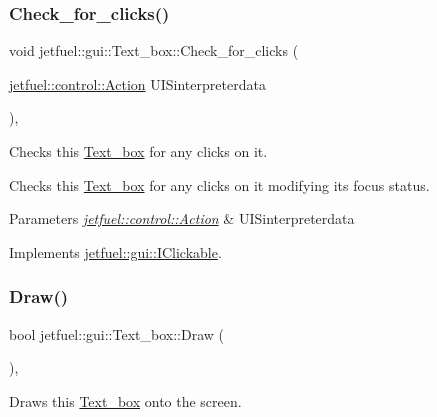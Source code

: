 \subsubsection{\texorpdfstring{Check\+\_\+for\+\_\+clicks()}{Check\_for\_clicks()}}
{\footnotesize\ttfamily void jetfuel\+::gui\+::\+Text\+\_\+box\+::\+Check\+\_\+for\+\_\+clicks (\begin{DoxyParamCaption}\item[{\hyperlink{structjetfuel_1_1control_1_1Action}{jetfuel\+::control\+::\+Action}}]{U\+I\+Sinterpreterdata }\end{DoxyParamCaption})\hspace{0.3cm}{\ttfamily [override]}, {\ttfamily [virtual]}}



Checks this \hyperlink{classjetfuel_1_1gui_1_1Text__box}{Text\+\_\+box} for any clicks on it. 

Checks this \hyperlink{classjetfuel_1_1gui_1_1Text__box}{Text\+\_\+box} for any clicks on it modifying it\textquotesingle{}s focus status.


\begin{DoxyParams}{Parameters}
{\em \hyperlink{structjetfuel_1_1control_1_1Action}{jetfuel\+::control\+::\+Action}} & U\+I\+Sinterpreterdata \\
\hline
\end{DoxyParams}


Implements \hyperlink{classjetfuel_1_1gui_1_1IClickable_aea45de37bd3beb7eb7e2e3056e4e37b3}{jetfuel\+::gui\+::\+I\+Clickable}.

\mbox{\label{classjetfuel_1_1gui_1_1Text__box_add6b8b170d66e4f6ee3c5878906bd2d1}} 
\subsubsection{\texorpdfstring{Draw()}{Draw()}}
{\footnotesize\ttfamily bool jetfuel\+::gui\+::\+Text\+\_\+box\+::\+Draw (\begin{DoxyParamCaption}{ }\end{DoxyParamCaption})\hspace{0.3cm}{\ttfamily [override]}, {\ttfamily [virtual]}}



Draws this \hyperlink{classjetfuel_1_1gui_1_1Text__box}{Text\+\_\+box} onto the screen. 

